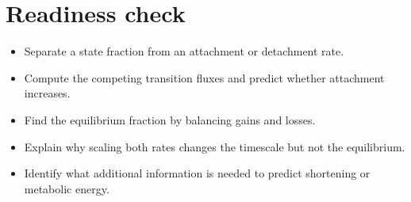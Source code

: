 \documentclass[11pt,letterpaper]{article}
\theoremstyle{definition}\newtheorem{definition}{Definition}\newtheorem{example}{Example}
\numberwithin{equation}{section}
\begin{document}
\section*{Readiness check}
\begin{itemize}
\item Separate a state fraction from an attachment or detachment rate.
\item Compute the competing transition fluxes and predict whether attachment increases.
\item Find the equilibrium fraction by balancing gains and losses.
\item Explain why scaling both rates changes the timescale but not the equilibrium.
\item Identify what additional information is needed to predict shortening or metabolic energy.
\end{itemize}
\end{document}
